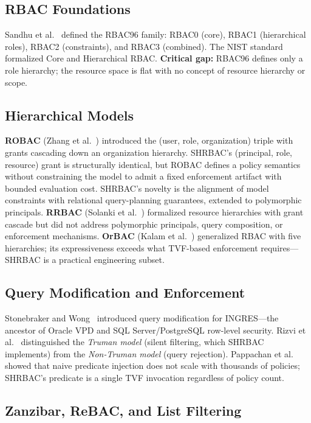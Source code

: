 \documentclass[conference]{IEEEtran}
\begin{document}
\subsection{RBAC Foundations}

Sandhu et al.~\cite{rbac96} defined the RBAC96 family: RBAC0 (core), RBAC1 (hierarchical roles), RBAC2 (constraints), and RBAC3 (combined). The NIST standard~\cite{nist-rbac} formalized Core and Hierarchical RBAC. \textbf{Critical gap:} RBAC96 defines only a role hierarchy; the resource space is flat with no concept of resource hierarchy or scope.

\subsection{Hierarchical Models}

\textbf{ROBAC} (Zhang et al.~\cite{robac}) introduced the (user, role, organization) triple with grants cascading down an organization hierarchy. SHRBAC's (principal, role, resource) grant is structurally identical, but ROBAC defines a policy semantics without constraining the model to admit a fixed enforcement artifact with bounded evaluation cost. SHRBAC's novelty is the alignment of model constraints with relational query-planning guarantees, extended to polymorphic principals. \textbf{RRBAC} (Solanki et al.~\cite{rrbac}) formalized resource hierarchies with grant cascade but did not address polymorphic principals, query composition, or enforcement mechanisms. \textbf{OrBAC} (Kalam et al.~\cite{orbac}) generalized RBAC with five hierarchies; its expressiveness exceeds what TVF-based enforcement requires---SHRBAC is a practical engineering subset.

\subsection{Query Modification and Enforcement}

Stonebraker and Wong~\cite{stonebraker} introduced query modification for INGRES---the ancestor of Oracle VPD and SQL Server/PostgreSQL row-level security. Rizvi et al.~\cite{rizvi} distinguished the \emph{Truman model} (silent filtering, which SHRBAC implements) from the \emph{Non-Truman model} (query rejection). Pappachan et al.~\cite{sieve} showed that naive predicate injection does not scale with thousands of policies; SHRBAC's predicate is a single TVF invocation regardless of policy count.

\subsection{Zanzibar, ReBAC, and List Filtering}
\end{document}
